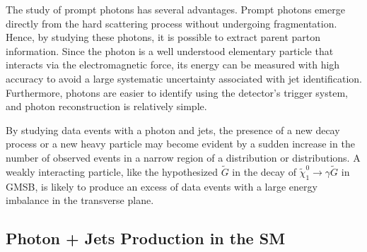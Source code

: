 The study of prompt photons has several advantages. Prompt photons emerge directly from the hard scattering process without undergoing fragmentation. Hence, by studying these photons, it is possible to extract parent parton information. Since the photon is a well understood elementary particle that interacts via the electromagnetic force, its energy can be measured with high accuracy to avoid a large systematic uncertainty associated with jet identification. Furthermore, photons are easier to identify using the detector's trigger system, and photon reconstruction is relatively simple.

By studying data events with a photon and jets, the presence of a new decay process or a new heavy particle may become evident by a sudden increase in the number of observed events in a narrow region of a distribution or distributions. A weakly interacting particle, like the hypothesized $\widetilde{G}$ in the decay of $\widetilde{\chi}^{0}_{1}\to\gamma \widetilde{G}$ in GMSB, is likely to produce an excess of data events with a large energy imbalance in the transverse plane.

\subsection{Photon + Jets Production in the SM}\label{sec:gjetProdInSM}

